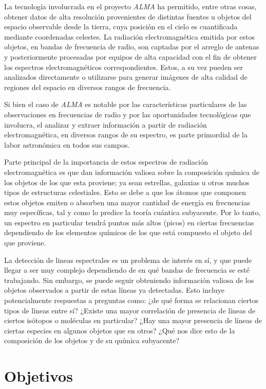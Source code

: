 \begin{intro}
La tecnología involucrada en el proyecto \textit{ALMA} ha permitido, entre otras cosas, obtener datos de alta resolución provenientes de distintas fuentes u objetos del espacio observable desde la tierra, cuya posición en el cielo es cuantificada mediante coordenadas celestes. La radiación electromagnética emitida por estos objetos, en bandas de frecuencia de radio, son captadas por el arreglo de antenas y posteriormente procesadas por equipos de alta capacidad con el fin de obtener los espectros electromagnéticos correspondientes. Estos, a su vez pueden ser analizados directamente o utilizarse para generar imágenes de alta calidad de regiones del espacio en diversos rangos de frecuencia.

Si bien el caso de \textit{ALMA} es notable por las características particulares de las observaciones en frecuencias de radio y por las oportunidades tecnológicas que involucra, el analizar y extraer información a partir de radiación electromagnética, en diversos rangos de su espectro, es parte primordial de la labor astronómica en todos sus campos.

Parte principal de la importancia de estos espectros de radiación electromagnética es que dan información valiosa sobre la composición química de los objetos de los que esta proviene; ya sean estrellas, galaxias u otros muchos tipos de estructuras celestiales. Esto se debe a que los átomos que componen estos objetos emiten o absorben una mayor cantidad de energía en frecuencias muy específicas, tal y como lo predice la teoría cuántica subyacente. Por lo tanto, un espectro en particular tendrá puntos más altos (picos) en ciertas frecuencias dependiendo de los elementos químicos de los que está compuesto el objeto del que proviene.

La detección de lineas espectrales es un problema de interés en sí, y que puede llegar a ser muy complejo dependiendo de en qué bandas de frecuencia se esté trabajando. Sin embargo, se puede seguir obteniendo información valiosa de los objetos observados a partir de estas líneas ya detectadas. Esto incluye potencialmente respuestas a preguntas como: ¿de qué forma se relacionan ciertos tipos de líneas entre sí? ¿Existe una mayor correlación de presencia de líneas de ciertos isótopos o moléculas en particular? ¿Hay una mayor presencia de líneas de ciertas especies en algunos objetos que en otros? ¿Qué nos dice esto de la composición de los objetos y de su química subyacente?

\section*{Objetivos}


\end{intro}
